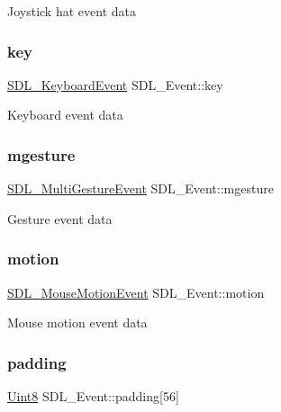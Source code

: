 Joystick hat event data \mbox{\label{union_s_d_l___event_ab99927835cc77a9b6bb50b419b4a27df}} 
\subsubsection{\texorpdfstring{key}{key}}
{\footnotesize\ttfamily \mbox{\hyperlink{struct_s_d_l___keyboard_event}{S\+D\+L\+\_\+\+Keyboard\+Event}} S\+D\+L\+\_\+\+Event\+::key}

Keyboard event data \mbox{\label{union_s_d_l___event_ac19b3c6a6b5181a51eb4fbe2cbe726a9}} 
\subsubsection{\texorpdfstring{mgesture}{mgesture}}
{\footnotesize\ttfamily \mbox{\hyperlink{struct_s_d_l___multi_gesture_event}{S\+D\+L\+\_\+\+Multi\+Gesture\+Event}} S\+D\+L\+\_\+\+Event\+::mgesture}

Gesture event data \mbox{\label{union_s_d_l___event_ac3c89e190faacbe84280cd539453bab6}} 
\subsubsection{\texorpdfstring{motion}{motion}}
{\footnotesize\ttfamily \mbox{\hyperlink{struct_s_d_l___mouse_motion_event}{S\+D\+L\+\_\+\+Mouse\+Motion\+Event}} S\+D\+L\+\_\+\+Event\+::motion}

Mouse motion event data \mbox{\label{union_s_d_l___event_aabb599570edfa54aad6255c1f24f2ad2}} 
\subsubsection{\texorpdfstring{padding}{padding}}
{\footnotesize\ttfamily \mbox{\hyperlink{_s_d_l__stdinc_8h_a2944638813a090aa23e62f4da842c3e2}{Uint8}} S\+D\+L\+\_\+\+Event\+::padding\mbox{[}56\mbox{]}}

